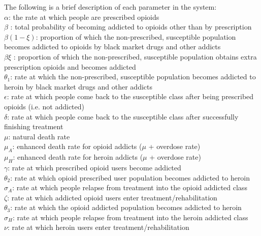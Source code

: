 \documentclass[12pt]{article}
\begin{document}
The following is a brief description of each parameter in the system: \\
$\alpha$: the rate at which people are prescribed opioids \\
$\beta$ : total probability of becoming addicted to opioids other than by prescription \\
$\beta(1-\xi)$: proportion of which the non-prescribed, susceptible population becomes addicted to opioids by black market drugs and other addicts \\
$\beta \xi$ : proportion of which the non-prescribed, susceptible population obtains extra prescription opioids and becomes addicted  \\
$\theta_1$: rate at which the non-prescribed, susceptible population becomes addicted to heroin by black market drugs and other addicts  \\
$\epsilon$: rate at which people come back to the susceptible class after being prescribed opioids (i.e. not addicted)\\
$\delta$: rate at which people come back to the susceptible class after successfully finishing treatment \\
$\mu$: natural death rate \\
$\mu_A$: enhanced death rate for opioid addicts ($\mu$ + overdose rate) \\
$\mu_H$: enhanced death rate for heroin addicts ($\mu$ + overdose rate) \\
$\gamma$: rate at which prescribed opioid users become addicted \\
$\theta_2$: rate at which opioid prescribed user population becomes addicted to heroin \\
$\sigma_A$: rate at which people relapse from treatment into the opioid addicted class \\
$\zeta$: rate at which addicted opioid users enter treatment/rehabilitation \\
$\theta_3$: rate at which the opioid addicted population becomes addicted to heroin \\
$\sigma_H$: rate at which people relapse from treatment into the heroin addicted class \\
$\nu$: rate at which heroin users enter treatment/rehabilitation \\ \\
\end{document}
